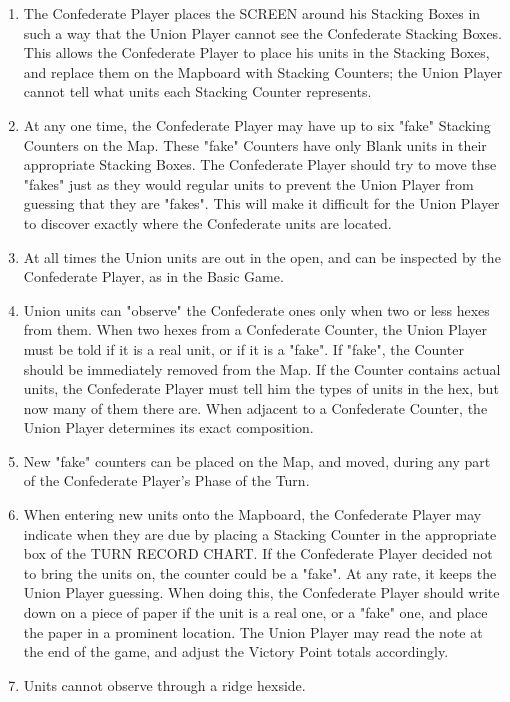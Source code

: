 \begin{enumerate}
  \item The Confederate Player places the SCREEN around his Stacking Boxes in such a way that the Union Player cannot see the Confederate Stacking Boxes. This allows the Confederate Player to place his units in the Stacking Boxes, and replace them on the Mapboard with Stacking Counters; the Union Player cannot tell what units each Stacking Counter represents.

  \item At any one time, the Confederate Player may have up to six "fake" Stacking Counters on the Map. These "fake" Counters have only Blank units in their appropriate Stacking Boxes. The Confederate Player should try to move thse "fakes" just as they would regular units to prevent the Union Player from guessing that they are "fakes". This will make it difficult for the Union Player to discover exactly where the Confederate units are located.

  \item At all times the Union units are out in the open, and can be inspected by the Confederate Player, as in the Basic Game.

  \item Union units can "observe" the Confederate ones only when two or less hexes from them. When two hexes from a Confederate Counter, the Union Player must be told if it is a real unit, or if it is a "fake". If "fake", the Counter should be immediately removed from the Map. If the Counter contains actual units, the Confederate Player must tell him the types of units in the hex, but now many of them there are. When adjacent to a Confederate Counter, the Union Player determines its exact composition.

  \item New "fake" counters can be placed on the Map, and moved, during any part of the Confederate Player's Phase of the Turn.

  \item When entering new units onto the Mapboard, the Confederate Player may indicate when they are due by placing a Stacking Counter in the appropriate box of the TURN RECORD CHART. If the Confederate Player decided not to bring the units on, the counter could be a "fake". At any rate, it keeps the Union Player guessing. When doing this, the Confederate Player should write down on a piece of paper if the unit is a real one, or a "fake" one, and place the paper in a prominent location. The Union Player may read the note at the end of the game, and adjust the Victory Point totals accordingly.

  \item Units cannot observe through a ridge hexside.
\end{enumerate}